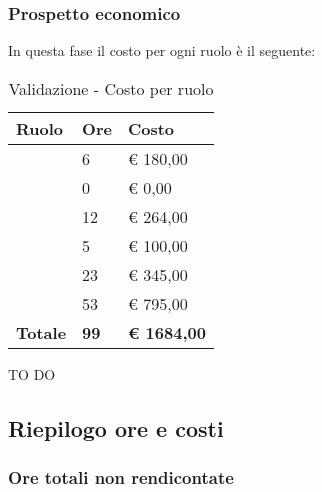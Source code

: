 		\subsubsection{Prospetto economico} %
		\label{ssub:prospetto_economico}
		In questa fase il costo per ogni ruolo è il seguente: \\
				\begin{table}[!h]
					\begin{center}
						\begin{tabularx}{0.65\textwidth}{|l|l|X|}
							\hline
							\textbf{Ruolo} & \textbf{Ore} & \textbf{Costo} \\
							\hline
							\roleProjectManager & 6 & \euro{} 180,00 \\
							\hline
							\roleAnalyst & 0 & \euro{} 0,00 \\
							\hline
							\roleDesigner & 12 & \euro{} 264,00 \\
							\hline
							\roleAdministrator & 5 & \euro{} 100,00 \\
							\hline
							\roleProgrammer & 23 & \euro{} 345,00 \\
							\hline
							\roleVerifier & 53 & \euro{} 795,00 \\
							\hline
							\textbf{Totale} & \textbf{99} & \textbf{\euro{} 1684,00} \\
							\hline
						\end{tabularx}
					\end{center}
				\caption{Validazione - Costo per ruolo}
				\end{table}

			\noindent
			TO DO
		
	
	\subsection{Riepilogo ore e costi} %
	\label{sub:riepilogo_ore_e_costi}
			
		\subsubsection{Ore totali non rendicontate} %
		\label{ssub:ore_totali_non_rendicontate}
